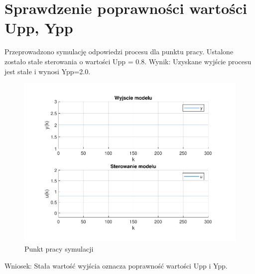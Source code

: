 \section{Sprawdzenie poprawności wartości Upp, Ypp}

Przeprowadzono symulację odpowiedzi procesu dla punktu pracy. 
Ustalone zostało stałe sterowania o wartości Upp = \num{0,8}.
Wynik: 
Uzyskane wyjście procesu jest stałe i wynosi Ypp=\num{2.0}.

\begin{figure}[H]
    \centering
    \includegraphics[scale=0.8]{../projekt/zad1/y.pdf}
    \caption{Punkt pracy symulacji}
\end{figure}

Wniosek: 
Stała wartość wyjścia oznacza poprawność wartości Upp i Ypp.

